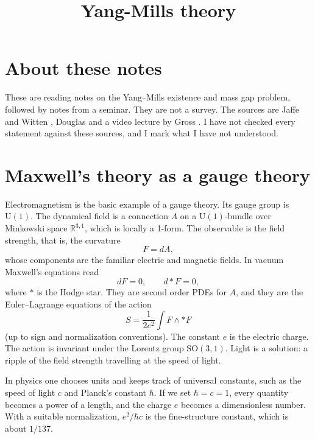 



\title{Yang-Mills theory}
\maketitle

\label{section-phantom}

\tableofcontents

\section{About these notes}

These are reading notes on the Yang--Mills
existence and mass gap problem, followed by
notes from a seminar. They are not a survey.
The sources are Jaffe and Witten
\cite{yangmills}, Douglas
\cite{reportdouglas} and a video lecture by
Gross \cite{gross-video}. I have not checked
every statement against these sources, and I
mark what I have not understood.

\section{Maxwell's theory as a gauge theory}

Electromagnetism is the basic example of a
gauge theory. Its gauge group is
$\mathrm{U}(1)$. The dynamical field is a
connection $A$ on a $\mathrm{U}(1)$-bundle
over Minkowski space $\mathbb{R}^{3,1}$,
which is locally a 1-form. The observable is
the field strength, that is, the curvature
$$
F=dA,
$$
whose components are the familiar electric
and magnetic fields. In vacuum Maxwell's
equations read
$$
dF=0,\qquad d{*}F=0,
$$
where $*$ is the Hodge star. They are second
order PDEs for $A$, and they are the
Euler--Lagrange equations of the action
$$
S=\frac{1}{2e^2}\int F\wedge {*F}
$$
(up to sign and normalization conventions).
The constant $e$ is the electric charge. The
action is invariant under the Lorentz group
$\mathrm{SO}(3,1)$. Light is a solution: a
ripple of the field strength travelling at
the speed of light.

In physics one chooses units and keeps track
of universal constants, such as the speed of
light $c$ and Planck's constant $\hbar$. If
we set $\hbar=c=1$, every quantity becomes a
power of a length, and the charge $e$ becomes
a dimensionless number. With a suitable
normalization, $e^2/\hbar c$ is the
fine-structure constant, which is about
$1/137$.

